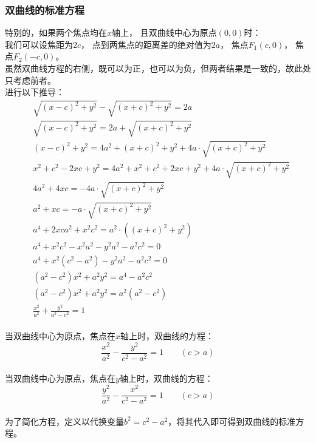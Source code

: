 \documentclass[UTF8]{ctexart}
\begin{document}
\subsubsection{双曲线的标准方程}
    特别的，如果两个焦点均在$x$轴上，
    且双曲线中心为原点$(0,0)$时：\\
    我们可以设焦距为$2c$，
    点到两焦点的距离差的绝对值为$2a$，
    焦点$F_1(c,0)$，
    焦点$F_2(-c,0)$。\\[3mm]
    虽然双曲线方程的右侧，既可以为正，也可以为负，但两者结果是一致的，故此处只考虑前者。\\[3mm]
    进行以下推导：\vspace{3pt}
    \setcounter{equation}{0}
    \begin{align}
        &\sqrt{(x-c)^2+y^2}-\sqrt{(x+c)^2+y^2}=2a\\[3.5mm]
        &\sqrt{(x-c)^2+y^2}=2a+\sqrt{(x+c)^2+y^2}\\[3.5mm]
        &(x-c)^2+y^2=4a^2+(x+c)^2+y^2+4a \cdot \sqrt{(x+c)^2+y^2}\\[3.5mm]
        &x^2+c^2-2xc+y^2=4a^2+x^2+c^2+2xc+y^2+4a \cdot \sqrt{(x+c)^2+y^2}\\[3.5mm]
        &4a^2+4xc=-4a \cdot \sqrt{(x+c)^2+y^2}\\[3.5mm]
        &a^2+xc=-a \cdot \sqrt{(x+c)^2+y^2}\\[3.5mm]
        &a^4+2xca^2+x^2c^2=a^2 \cdot ((x+c)^2+y^2)\\[3.5mm]
        &a^4+x^2c^2-x^2a^2-y^2a^2-a^2c^2=0\\[3.5mm]
        &a^4+x^2(c^2-a^2)-y^2a^2-a^2c^2=0\\[3.5mm]
        &(a^2-c^2)x^2+a^2y^2=a^4-a^2c^2\\[3.5mm]
        &(a^2-c^2)x^2+a^2y^2=a^2(a^2-c^2)\\[3.5mm]
        &\frac{x^2}{a^2}+\frac{y^2}{a^2-c^2}=1
    \end{align}\\
    当双曲线中心为原点，焦点在$x$轴上时，双曲线的方程：\vspace{5pt}
    \begin{equation}
        \frac{x^2}{a^2}-\frac{y^2}{c^2-a^2}=1\qquad(c>a)
    \end{equation}\\
    当双曲线中心为原点，焦点在$y$轴上时，双曲线的方程：\vspace{5pt}
    \begin{equation}
        \frac{y^2}{a^2}-\frac{x^2}{c^2-a^2}=1\qquad(c>a)
    \end{equation}\\
    为了简化方程，定义以代换变量$b^2=c^2-a^2$，将其代入即可得到双曲线的标准方程。
\end{document}
